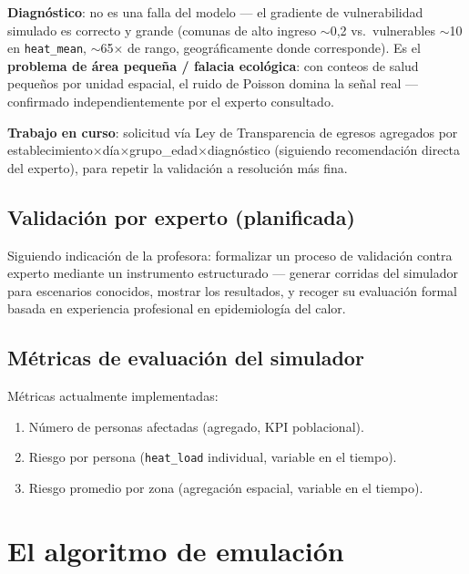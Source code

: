\documentclass[11pt,a4paper]{article}
\begin{document}
\textbf{Diagnóstico}: no es una falla del modelo --- el gradiente de
vulnerabilidad simulado es correcto y grande (comunas de alto ingreso
$\sim$0,2 vs.\ vulnerables $\sim$10 en \texttt{heat\_mean}, $\sim$65$\times$
de rango, geográficamente donde corresponde). Es el \textbf{problema de área
pequeña / falacia ecológica}: con conteos de salud pequeños por unidad
espacial, el ruido de Poisson domina la señal real --- confirmado
independientemente por el experto consultado.

\textbf{Trabajo en curso}: solicitud vía Ley de Transparencia de egresos
agregados por establecimiento$\times$día$\times$grupo\_edad$\times$diagnóstico
(siguiendo recomendación directa del experto), para repetir la validación a
resolución más fina.

\subsection{Validación por experto (planificada)}

Siguiendo indicación de la profesora: formalizar un proceso de validación
contra experto mediante un instrumento estructurado --- generar corridas del
simulador para escenarios conocidos, mostrar los resultados, y recoger su
evaluación formal basada en experiencia profesional en epidemiología del
calor.

\subsection{Métricas de evaluación del simulador}

Métricas actualmente implementadas:
\begin{enumerate}[leftmargin=*]
    \item Número de personas afectadas (agregado, KPI poblacional).
    \item Riesgo por persona (\texttt{heat\_load} individual, variable en el tiempo).
    \item Riesgo promedio por zona (agregación espacial, variable en el tiempo).
\end{enumerate}


\section{El algoritmo de emulación}
\end{document}
